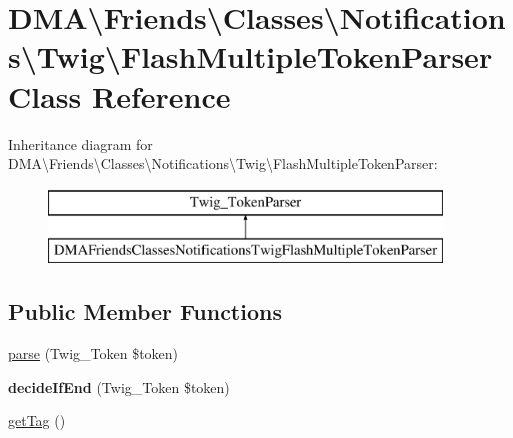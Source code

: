 \hypertarget{classDMA_1_1Friends_1_1Classes_1_1Notifications_1_1Twig_1_1FlashMultipleTokenParser}{}\section{D\+M\+A\textbackslash{}Friends\textbackslash{}Classes\textbackslash{}Notifications\textbackslash{}Twig\textbackslash{}Flash\+Multiple\+Token\+Parser Class Reference}
\label{classDMA_1_1Friends_1_1Classes_1_1Notifications_1_1Twig_1_1FlashMultipleTokenParser}
Inheritance diagram for D\+M\+A\textbackslash{}Friends\textbackslash{}Classes\textbackslash{}Notifications\textbackslash{}Twig\textbackslash{}Flash\+Multiple\+Token\+Parser\+:\begin{figure}[H]
\begin{center}
\leavevmode
\includegraphics[height=2.000000cm]{d7/d2c/classDMA_1_1Friends_1_1Classes_1_1Notifications_1_1Twig_1_1FlashMultipleTokenParser}
\end{center}
\end{figure}
\subsection*{Public Member Functions}
\begin{DoxyCompactItemize}
\item 
\hyperlink{classDMA_1_1Friends_1_1Classes_1_1Notifications_1_1Twig_1_1FlashMultipleTokenParser_a73e24854cc05f744decb4d0769b2dd84}{parse} (Twig\+\_\+\+Token \$token)
\item 
\hypertarget{classDMA_1_1Friends_1_1Classes_1_1Notifications_1_1Twig_1_1FlashMultipleTokenParser_afad4687567f31be1db4e56df268bc0ca}{}{\bfseries decide\+If\+End} (Twig\+\_\+\+Token \$token)\label{classDMA_1_1Friends_1_1Classes_1_1Notifications_1_1Twig_1_1FlashMultipleTokenParser_afad4687567f31be1db4e56df268bc0ca}

\item 
\hyperlink{classDMA_1_1Friends_1_1Classes_1_1Notifications_1_1Twig_1_1FlashMultipleTokenParser_aaf7a39a5197184382a689e49d0de53e6}{get\+Tag} ()
\end{DoxyCompactItemize}


